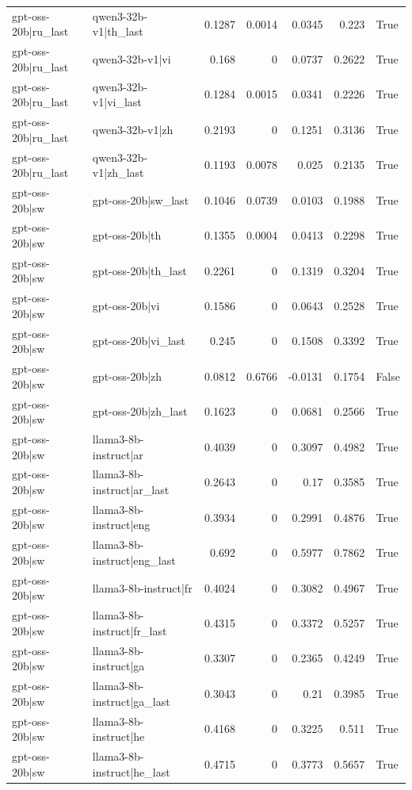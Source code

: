 \begin{table}
\begin{tabular}{l l r r r r l}
gpt-oss-20b|ru_last & qwen3-32b-v1|th_last & 0.1287 & 0.0014 & 0.0345 & 0.223 & True \\
gpt-oss-20b|ru_last & qwen3-32b-v1|vi & 0.168 & 0 & 0.0737 & 0.2622 & True \\
gpt-oss-20b|ru_last & qwen3-32b-v1|vi_last & 0.1284 & 0.0015 & 0.0341 & 0.2226 & True \\
gpt-oss-20b|ru_last & qwen3-32b-v1|zh & 0.2193 & 0 & 0.1251 & 0.3136 & True \\
gpt-oss-20b|ru_last & qwen3-32b-v1|zh_last & 0.1193 & 0.0078 & 0.025 & 0.2135 & True \\
gpt-oss-20b|sw & gpt-oss-20b|sw_last & 0.1046 & 0.0739 & 0.0103 & 0.1988 & True \\
gpt-oss-20b|sw & gpt-oss-20b|th & 0.1355 & 0.0004 & 0.0413 & 0.2298 & True \\
gpt-oss-20b|sw & gpt-oss-20b|th_last & 0.2261 & 0 & 0.1319 & 0.3204 & True \\
gpt-oss-20b|sw & gpt-oss-20b|vi & 0.1586 & 0 & 0.0643 & 0.2528 & True \\
gpt-oss-20b|sw & gpt-oss-20b|vi_last & 0.245 & 0 & 0.1508 & 0.3392 & True \\
gpt-oss-20b|sw & gpt-oss-20b|zh & 0.0812 & 0.6766 & -0.0131 & 0.1754 & False \\
gpt-oss-20b|sw & gpt-oss-20b|zh_last & 0.1623 & 0 & 0.0681 & 0.2566 & True \\
gpt-oss-20b|sw & llama3-8b-instruct|ar & 0.4039 & 0 & 0.3097 & 0.4982 & True \\
gpt-oss-20b|sw & llama3-8b-instruct|ar_last & 0.2643 & 0 & 0.17 & 0.3585 & True \\
gpt-oss-20b|sw & llama3-8b-instruct|eng & 0.3934 & 0 & 0.2991 & 0.4876 & True \\
gpt-oss-20b|sw & llama3-8b-instruct|eng_last & 0.692 & 0 & 0.5977 & 0.7862 & True \\
gpt-oss-20b|sw & llama3-8b-instruct|fr & 0.4024 & 0 & 0.3082 & 0.4967 & True \\
gpt-oss-20b|sw & llama3-8b-instruct|fr_last & 0.4315 & 0 & 0.3372 & 0.5257 & True \\
gpt-oss-20b|sw & llama3-8b-instruct|ga & 0.3307 & 0 & 0.2365 & 0.4249 & True \\
gpt-oss-20b|sw & llama3-8b-instruct|ga_last & 0.3043 & 0 & 0.21 & 0.3985 & True \\
gpt-oss-20b|sw & llama3-8b-instruct|he & 0.4168 & 0 & 0.3225 & 0.511 & True \\
gpt-oss-20b|sw & llama3-8b-instruct|he_last & 0.4715 & 0 & 0.3773 & 0.5657 & True \\

\end{tabular}
\end{table}
